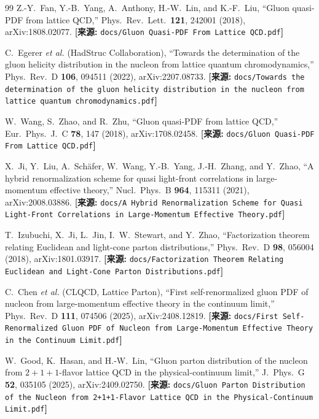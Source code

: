 \documentclass[12pt,a4paper]{ctexart}
\theoremstyle{definition}
\begin{document}
\begin{thebibliography}{99}
Z.-Y.~Fan, Y.-B.~Yang, A.~Anthony, H.-W.~Lin, and K.-F.~Liu,
``Gluon quasi-PDF from lattice QCD,''
Phys.\ Rev.\ Lett.\ \textbf{121}, 242001 (2018), arXiv:1808.02077.
\quad\textbf{[来源:} \texttt{docs/Gluon Quasi-PDF From Lattice QCD.pdf}\textbf{]}

C.~Egerer \textit{et al.} (HadStruc Collaboration),
``Towards the determination of the gluon helicity distribution in the nucleon from lattice quantum chromodynamics,''
Phys.\ Rev.\ D \textbf{106}, 094511 (2022), arXiv:2207.08733.
\quad\textbf{[来源:} \texttt{docs/Towards the determination of the gluon helicity distribution in the nucleon from lattice quantum chromodynamics.pdf}\textbf{]}

W.~Wang, S.~Zhao, and R.~Zhu,
``Gluon quasi-PDF from lattice QCD,''
Eur.\ Phys.\ J.\ C \textbf{78}, 147 (2018), arXiv:1708.02458.
\quad\textbf{[来源:} \texttt{docs/Gluon Quasi-PDF From Lattice QCD.pdf}\textbf{]}

X.~Ji, Y.~Liu, A.~Sch\"afer, W.~Wang, Y.-B.~Yang, J.-H.~Zhang, and Y.~Zhao,
``A hybrid renormalization scheme for quasi light-front correlations in large-momentum effective theory,''
Nucl.\ Phys.\ B \textbf{964}, 115311 (2021), arXiv:2008.03886.
\quad\textbf{[来源:} \texttt{docs/A Hybrid Renormalization Scheme for Quasi Light-Front Correlations in Large-Momentum Effective Theory.pdf}\textbf{]}

T.~Izubuchi, X.~Ji, L.~Jin, I.~W.~Stewart, and Y.~Zhao,
``Factorization theorem relating Euclidean and light-cone parton distributions,''
Phys.\ Rev.\ D \textbf{98}, 056004 (2018), arXiv:1801.03917.
\quad\textbf{[来源:} \texttt{docs/Factorization Theorem Relating Euclidean and Light-Cone Parton Distributions.pdf}\textbf{]}

C.~Chen \textit{et al.} (CLQCD, Lattice Parton),
``First self-renormalized gluon PDF of nucleon from large-momentum effective theory in the continuum limit,''
Phys.\ Rev.\ D \textbf{111}, 074506 (2025), arXiv:2408.12819.
\quad\textbf{[来源:} \texttt{docs/First Self-Renormalized Gluon PDF of Nucleon from Large-Momentum Effective Theory in the Continuum Limit.pdf}\textbf{]}

W.~Good, K.~Hasan, and H.-W.~Lin,
``Gluon parton distribution of the nucleon from $2+1+1$-flavor lattice QCD in the physical-continuum limit,''
J.\ Phys.\ G \textbf{52}, 035105 (2025), arXiv:2409.02750.
\quad\textbf{[来源:} \texttt{docs/Gluon Parton Distribution of the Nucleon from 2+1+1-Flavor Lattice QCD in the Physical-Continuum Limit.pdf}\textbf{]}


\end{thebibliography}
\end{document}
